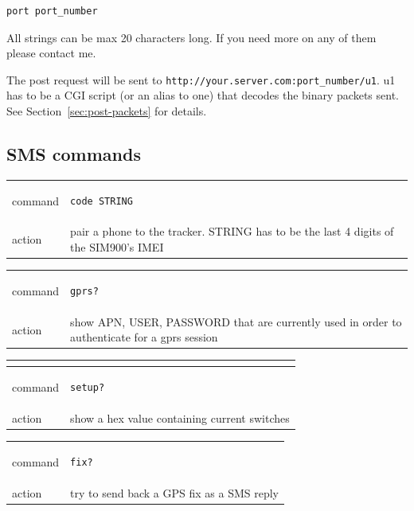 \documentclass[a4paper,twoside]{refart}
\begin{document}
\begin{lstlisting}
port port_number
\end{lstlisting}

 All strings can be max 20 characters long. If you need more on any of them please contact me.

The post request will be sent to \verb"http://your.server.com:port_number/u1". u1 has to be a CGI script (or an alias to one) that decodes the binary packets sent. See Section~\ref{sec:post-packets} for details.

\subsection{SMS commands}

\begin{tabular}{ |l|p{8cm}| }
    \hline
        command & 
\begin{lstlisting}
code STRING
\end{lstlisting} \\
        action & pair a phone to the tracker.
STRING has to be the last 4 digits of the SIM900's IMEI \\ \hline
\end{tabular}


\begin{tabular}{ |l|p{8cm}| }
    \hline
        command & 
\begin{lstlisting}
gprs?
\end{lstlisting} \\
        action & show APN, USER, PASSWORD that are currently used in order to authenticate for a gprs session \\ \hline
\end{tabular}


\begin{tabular}{ |l|p{8cm}| }
    \hline
    \multicolumn{2}{|l|}{} \\
    \hline
        command & 
\begin{lstlisting}
setup?
\end{lstlisting} \\
        action & show a hex value containing current switches \\ \hline
\end{tabular}


\begin{tabular}{ |l|p{8cm}| }
    \hline
        command & 
\begin{lstlisting}
fix?
\end{lstlisting} \\
        action & 
try to send back a GPS fix as a SMS reply \\ \hline
\end{tabular}
\end{document}
